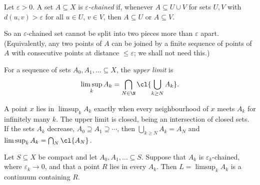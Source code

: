 \begin{definition}\label{def:chained}
Let $\varepsilon>0$. A set $A\subseteq X$ is \emph{$\varepsilon$-chained} if, whenever
$A\subseteq U\cup V$ for sets $U,V$ with $d(u,v)>\varepsilon$ for all $u\in U$, $v\in V$, then
$A\subseteq U$ or $A\subseteq V$.
\end{definition}

So an $\varepsilon$-chained set cannot be split into two pieces more than $\varepsilon$ apart.
(Equivalently, any two points of $A$ can be joined by a finite sequence of points of $A$
with consecutive points at distance $\le\varepsilon$; we shall not need this.)


\begin{definition}\label{def:limsup}
For a sequence of sets $A_0,A_1,\dots\subseteq X$, the \emph{upper limit} is
\[
\limsup_k A_k=\bigcap_{N\in\N}\cl{\bigcup_{k\ge N}A_k}.
\]
\end{definition}

A point $x$ lies in $\limsup_k A_k$ exactly when every neighbourhood of $x$ meets $A_k$ for
infinitely many $k$. The upper limit is closed, being an intersection of closed sets. If
the sets $A_k$ decrease, $A_0\supseteq A_1\supseteq\cdots$, then
$\bigcup_{k\ge N}A_k=A_N$ and $\limsup_k A_k=\bigcap_N\cl{A_N}$.

\begin{lemma}\label{lem:limsup}
Let $S\subseteq X$ be compact and let $A_0,A_1,\dots\subseteq S$. Suppose that $A_k$ is
$\varepsilon_k$-chained, where $\varepsilon_k\to0$, and that a point $R$ lies in every $A_k$.
Then $L=\limsup_kA_k$ is a continuum containing $R$.
\end{lemma}


